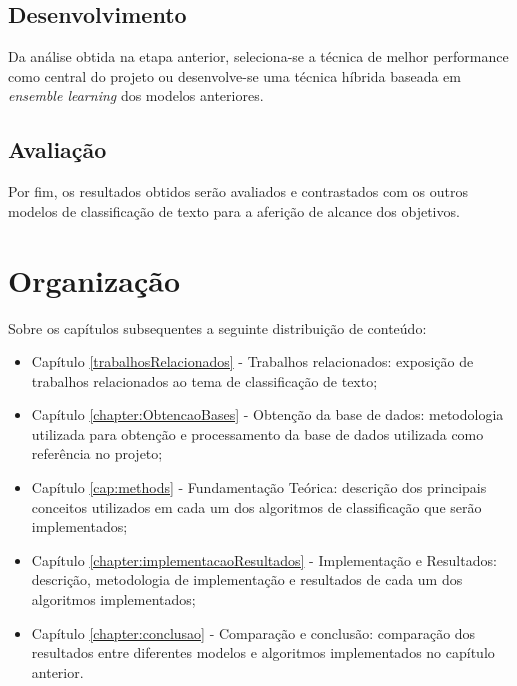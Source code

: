\subsection{Desenvolvimento}
\label{subsec:desenvolvimento}
Da análise obtida na etapa anterior, seleciona-se a técnica de melhor performance como central do projeto ou desenvolve-se uma técnica híbrida baseada em \textit{ensemble learning} dos modelos anteriores.
\subsection{Avaliação}
\label{subsec:avaliacao}
Por fim, os resultados obtidos serão avaliados e contrastados com os outros modelos de classificação de texto para a aferição de alcance dos objetivos.

\section{Organização}
Sobre os capítulos subsequentes a seguinte distribuição de conteúdo:
\begin{itemize}
\item Capítulo \ref{trabalhosRelacionados} - Trabalhos relacionados:
exposição de trabalhos relacionados ao tema de classificação de texto;
\item Capítulo \ref{chapter:ObtencaoBases} - Obtenção da base de dados:
metodologia utilizada para obtenção e processamento da base de dados utilizada como referência no projeto;
\item Capítulo \ref{cap:methods} - Fundamentação Teórica:
descrição dos principais conceitos utilizados em cada um dos algoritmos de classificação que serão implementados;
\item Capítulo \ref{chapter:implementacaoResultados} - Implementação e Resultados:
descrição, metodologia de implementação e resultados de cada um dos algoritmos implementados;
\item Capítulo \ref{chapter:conclusao} - Comparação e conclusão:
comparação dos resultados entre diferentes modelos e algoritmos implementados no capítulo anterior.
\end{itemize}